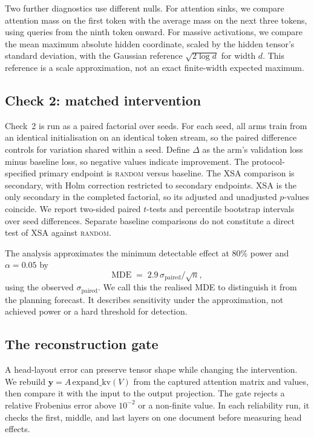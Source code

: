 \documentclass{article} %
\newcommand{\yv}{\mathbf{y}}
\begin{document}
\begin{samepage}
Two further diagnostics use different nulls. For attention sinks, we compare
attention mass on the first token with the average mass on the next three
tokens, using queries from the ninth token onward. For massive activations,
we compare the mean maximum absolute hidden coordinate, scaled by the hidden
tensor's standard deviation, with the Gaussian reference
$\sqrt{2\log d}$ for width $d$. This reference is a scale approximation,
not an exact finite-width expected maximum.
\end{samepage}

\subsection{Check 2: matched intervention}
\label{sec:check2}

Check~2 is run as a paired factorial over seeds. For each seed, all arms train
from an identical initialisation on an identical token stream, so the paired
difference controls for variation shared within a seed. Define $\Delta$ as
the arm's validation loss minus baseline loss, so negative values indicate
improvement. The protocol-specified primary endpoint is \textsc{random}
versus baseline. The XSA comparison is secondary, with Holm correction
\citep{holm1979simple} restricted to secondary endpoints. XSA is the only
secondary in the completed factorial, so its adjusted and unadjusted
$p$-values coincide. We report two-sided paired $t$-tests and percentile
bootstrap intervals over seed differences. Separate baseline comparisons
do not constitute a direct test of XSA against \textsc{random}.

The analysis approximates the minimum detectable effect at $80\%$ power and
$\alpha = 0.05$ by
%
\begin{equation}
\text{MDE} \;=\; 2.9\,\sigma_{\text{paired}} \big/ \sqrt{n},
\label{eq:mde}
\end{equation}
%
using the observed $\sigma_{\text{paired}}$. We call this the realised MDE
to distinguish it from the planning forecast. It describes sensitivity under
the approximation, not achieved power or a hard threshold for detection.

\subsection{The reconstruction gate}
\label{sec:gate}

A head-layout error can preserve tensor shape while changing the intervention.
We rebuild $\yv = A\,\mathrm{expand\_kv}(V)$ from the captured attention
matrix and values, then compare it with the input to the output projection.
The gate rejects a relative Frobenius error above $10^{-2}$ or a non-finite
value. In each reliability run, it checks the first, middle, and last layers
on one document before measuring head effects.
\end{document}
